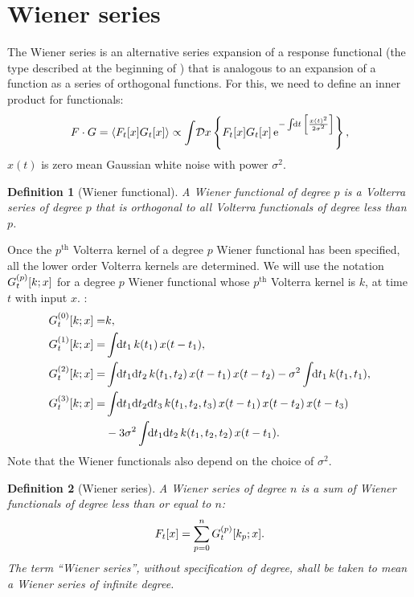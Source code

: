 \documentclass[12pt]{article}
\theoremstyle{slplain}
\theoremstyle{sldefinition}
\newtheorem{defn}{Definition}
\theoremstyle{remark}
\begin{document}
\section{Wiener series}\label{sec:wiener}

The Wiener series is an alternative series expansion of a response functional (the type described at the beginning of ) that is analogous to an expansion of a function as a series of orthogonal functions. For this, we need to define an inner product for functionals:
%
\begin{equation}\label{eq:innerfunc}
  F \cdot G = \av{F_t[x]G_t[x]} \propto \int\!\CD x \brc{F_t[x]G_t[x]\,\e^{-\intd{t}\brk{\frac{x(t)^2}{2\sigma^2}}}},
\end{equation}
%
\ie $x(t)$ is zero mean Gaussian white noise with power $\sigma^2$.

\begin{defn}[Wiener functional]
  A Wiener functional of degree $p$ is a Volterra series of degree $p$ that is orthogonal to all Volterra functionals of degree less than $p$.
\end{defn}

Once the $p^{\text{th}}$ Volterra kernel of a degree $p$ Wiener functional has been specified, all the lower order Volterra kernels are determined. We will use the notation $G^{(p)}_t[k;x]$ for a degree $p$ Wiener functional whose $p^{\text{th}}$ Volterra kernel is $k$, at time $t$ with input $x$. \eg \cite[ch.12]{schetzen:1980}:
%
\begin{equation}\label{eq:wienerex}
  \begin{aligned}
    G\rp{0}_t[k;x] =& k, \\
    G\rp{1}_t[k;x] =& \intd{t_1}k(t_1)\,x(t-t_1), \\
    G\rp{2}_t[k;x] =& \intd{t_1\dr t_2} k(t_1,t_2)\,x(t-t_1)\,x(t-t_2)
                     -\sigma^2\intd{t_1}k(t_1,t_1), \\
    G\rp{3}_t[k;x] =& \intd{t_1\dr t_2\dr t_3} k(t_1,t_2,t_3)\,x(t-t_1)\,x(t-t_2)\,x(t-t_3)\\
                     &-3\sigma^2\intd{t_1\dr t_2} k(t_1,t_2,t_2)\,x(t-t_1).
  \end{aligned}
\end{equation}
%
Note that the Wiener functionals also depend on the choice of $\sigma^2$.

\begin{defn}[Wiener series]
  A Wiener series of degree $n$ is a sum of Wiener functionals of degree less than or equal to $n$:
  \begin{equation}\label{eq:wienerser}
    F_t[x] = \sum_{p=0}^n G^{(p)}_t[k_p;x].
  \end{equation}
  The term ``Wiener series'', without specification of degree, shall be taken to mean a Wiener series of infinite degree.
\end{defn}
\end{document}
